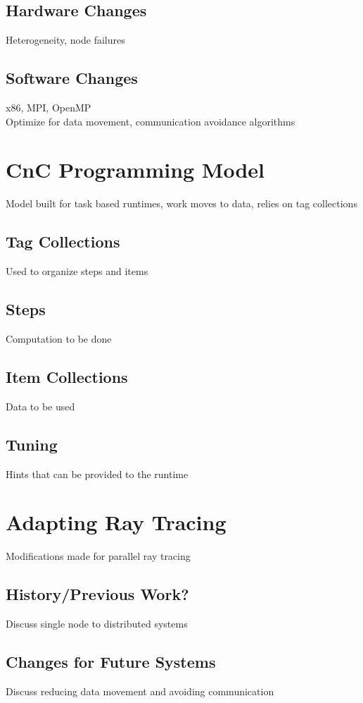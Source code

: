 \documentclass{vgtc}                          %
\begin{document}
\subsection{Hardware Changes}
Heterogeneity, node failures
\subsection{Software Changes}
x86, MPI, OpenMP \\ 
Optimize for data movement, 
communication avoidance algorithms \\

\section{CnC Programming Model}
Model built for task based runtimes, work moves to data, 
relies on tag collections
\subsection{Tag Collections}
Used to organize steps and items
\subsection{Steps}
Computation to be done
\subsection{Item Collections}
Data to be used
\subsection{Tuning}
Hints that can be provided to the runtime \\

\section{Adapting Ray Tracing}
Modifications made for parallel ray tracing
\subsection{History/Previous Work?}
Discuss single node to distributed systems
\subsection{Changes for Future Systems}
Discuss reducing data movement and avoiding communication 
\end{document}
